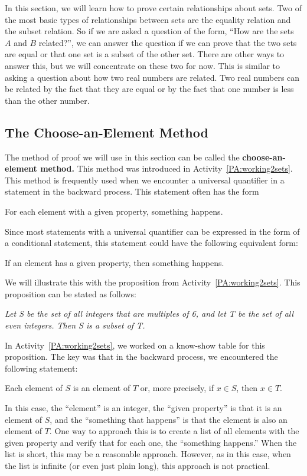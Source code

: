 In this section, we will learn how to prove certain relationships about sets.  Two of the most basic types of relationships between sets are the equality relation and the subset relation.  So if we are asked a question of the form, ``How are the sets  $A$  and  $B$  related?'', we can answer the question if we can prove that the two sets are equal or that one set is a subset of the other set.  There are other ways to answer this, but we will concentrate on these two for now.  This is similar to asking a question about how two real numbers are related.  Two real numbers can be related by the fact that they are equal or by the fact that one number is less than the other number.

\subsection*{The Choose-an-Element Method} \label{SS:choosemethod}
The method of proof we will use in this section can be called the \textbf{choose-an-element method.}
%
 This method was introduced in \typeu Activity~\ref*{PA:working2sets}.  This method is frequently used when we encounter a universal quantifier in a statement in the backward process.  This statement often has the form

\begin{center}
For each element with a given property, something happens.
\end{center}
Since most statements with a universal quantifier can be expressed in the form of a conditional statement, this statement could have the following equivalent form:

\begin{center}
If an element has a given property, then something happens.
\end{center}
We will illustrate this with the proposition from \typeu Activity~\ref*{PA:working2sets}.  This proposition can be stated as follows:
\begin{list}{}
\item \emph{Let  S  be the set of all integers that are multiples of  6, and let  T  be the set of all even integers.  Then  S  is a subset of  T.}
\end{list}

\newpar
In \typeu Activity~\ref*{PA:working2sets}, we worked on a know-show table for this proposition.  The key was that in the backward process, we encountered the following statement:

\begin{list}{}
\item Each element of  $S$  is an element of   $T$ or, more precisely, if  $x \in S$\!, then  
$x \in T$\!.
\end{list}
\vskip10pt
In this case, the ``element'' is an integer, the ``given property'' is that it is an element of  $S$, and the ``something that happens'' is that  the element is also an element of  $T$.
One way to approach this is to create a list of all elements with the given property and verify that for each one, the ``something happens.''  When the list is short, this may be a reasonable approach. However, as in this case, when the list is infinite (or even just plain long), this approach is not practical.

